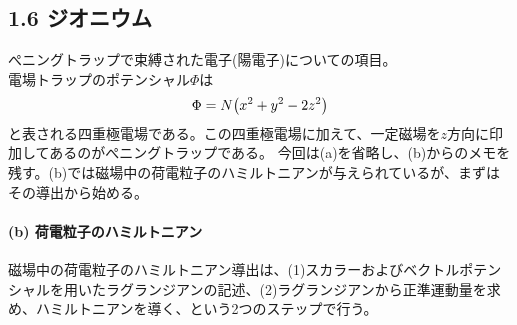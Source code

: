 \documentclass[11pt,a4paper]{jsarticle}
\begin{document}
\subsection*{1.6 ジオニウム}
ぺニングトラップで束縛された電子(陽電子)についての項目。\\
電場トラップのポテンシャル$\Phi$は
\begin{equation}
  \Phi = N \bigl(x^2 + y^2 -2z^2 \bigr)\\
\end{equation}
と表される四重極電場である。この四重極電場に加えて、一定磁場を$z$方向に印加してあるのがぺニングトラップである。
今回は(a)を省略し、(b)からのメモを残す。(b)では磁場中の荷電粒子のハミルトニアンが与えられているが、まずはその導出から始める。
\paragraph{(b) 荷電粒子のハミルトニアン\\}
磁場中の荷電粒子のハミルトニアン導出は、(1)スカラーおよびベクトルポテンシャルを用いたラグランジアンの記述、(2)ラグランジアンから正準運動量を求め、ハミルトニアンを導く、という2つのステップで行う。
\end{document}
